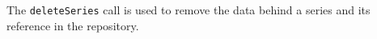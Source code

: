 The \verb+deleteSeries+ call is used to remove the data behind a series and its
reference in the repository.
